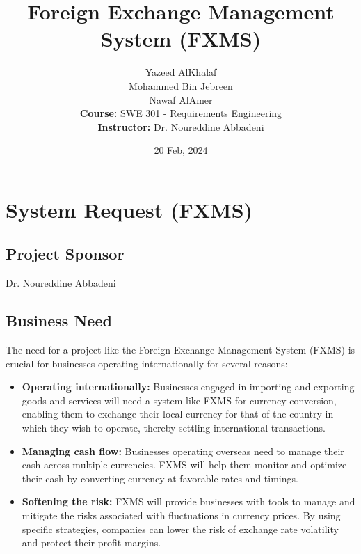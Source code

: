 \documentclass[a4paper]{report}
\title{Foreign Exchange Management System (FXMS)}
\author{
    Yazeed AlKhalaf \\
    Mohammed Bin Jebreen \\
    Nawaf AlAmer \\
    \textbf{Course:} SWE 301 - Requirements Engineering \\
    \textbf{Instructor:} Dr. Noureddine Abbadeni
}
\date{20 Feb, 2024}
\begin{document}
\maketitle

\newpage

\tableofcontents

\chapter{System Request (FXMS)}

\section{Project Sponsor}
Dr. Noureddine Abbadeni

\section{Business Need}
The need for a project like the Foreign Exchange Management System (FXMS) is crucial for businesses operating internationally for several reasons:
\begin{itemize}
    \item \textbf{Operating internationally:} Businesses engaged in importing and exporting goods and services will need a system like FXMS for currency conversion, enabling them to exchange their local currency for that of the country in which they wish to operate, thereby settling international transactions.
    \item \textbf{Managing cash flow:} Businesses operating overseas need to manage their cash across multiple currencies. FXMS will help them monitor and optimize their cash by converting currency at favorable rates and timings.
    \item \textbf{Softening the risk:} FXMS will provide businesses with tools to manage and mitigate the risks associated with fluctuations in currency prices. By using specific strategies, companies can lower the risk of exchange rate volatility and protect their profit margins.
\end{itemize}
\end{document}
